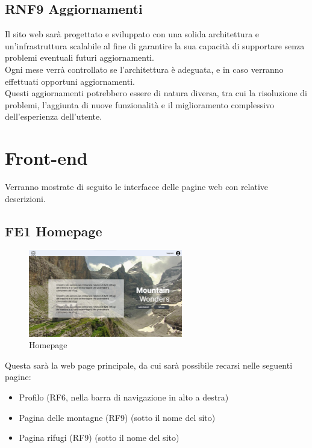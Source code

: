 \documentclass[a4paper,12pt]{article}
\begin{document}
\subsection*{RNF9 Aggiornamenti} 
Il sito web sarà progettato e sviluppato con una solida architettura e un'infrastruttura scalabile al fine di garantire la sua capacità di supportare senza problemi eventuali futuri aggiornamenti.\\
Ogni mese verrà controllato se l'architettura è adeguata, e in caso verranno effettuati opportuni aggiornamenti.\\
Questi aggiornamenti potrebbero essere di natura diversa, tra cui la risoluzione di problemi, l'aggiunta di nuove funzionalità e il miglioramento complessivo dell'esperienza dell'utente.
 


\newpage
\section{Front-end}
Verranno mostrate di seguito le interfacce delle pagine web con relative descrizioni.
\subsection*{FE1 Homepage}
\begin{figure}[ht]
   \centering
    \includegraphics[width=0.6\textwidth]{img/Homepage.png}
    \caption{Homepage}
\end{figure}
Questa sarà la web page principale, da cui sarà possibile recarsi nelle seguenti pagine:
\begin{itemize}
    \item Profilo (RF6, nella barra di navigazione in alto a destra)
    \item Pagina delle montagne (RF9) (sotto il nome del sito)
    \item Pagina rifugi (RF9) (sotto il nome del sito)
\end{itemize}
\end{document}
